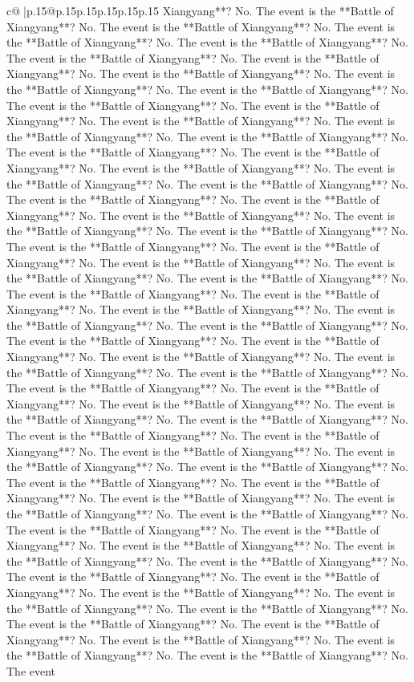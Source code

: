 \documentclass{article}
\begin{document}
{\begin{supertabular}{c@{$\;$}|p{.15\linewidth}@{}p{.15\linewidth}p{.15\linewidth}p{.15\linewidth}p{.15\linewidth}p{.15\linewidth}}
{{{Xiangyang**? No. The event is the **Battle of Xiangyang**? No. The event is the **Battle of Xiangyang**? No. The event is the **Battle of Xiangyang**? No. The event is the **Battle of Xiangyang**? No. The event is the **Battle of Xiangyang**? No. The event is the **Battle of Xiangyang**? No. The event is the **Battle of Xiangyang**? No. The event is the **Battle of Xiangyang**? No. The event is the **Battle of Xiangyang**? No. The event is the **Battle of Xiangyang**? No. The event is the **Battle of Xiangyang**? No. The event is the **Battle of Xiangyang**? No. The event is the **Battle of Xiangyang**? No. The event is the **Battle of Xiangyang**? No. The event is the **Battle of Xiangyang**? No. The event is the **Battle of Xiangyang**? No. The event is the **Battle of Xiangyang**? No. The event is the **Battle of Xiangyang**? No. The event is the **Battle of Xiangyang**? No. The event is the **Battle of Xiangyang**? No. The event is the **Battle of Xiangyang**? No. The event is the **Battle of Xiangyang**? No. The event is the **Battle of Xiangyang**? No. The event is the **Battle of Xiangyang**? No. The event is the **Battle of Xiangyang**? No. The event is the **Battle of Xiangyang**? No. The event is the **Battle of Xiangyang**? No. The event is the **Battle of Xiangyang**? No. The event is the **Battle of Xiangyang**? No. The event is the **Battle of Xiangyang**? No. The event is the **Battle of Xiangyang**? No. The event is the **Battle of Xiangyang**? No. The event is the **Battle of Xiangyang**? No. The event is the **Battle of Xiangyang**? No. The event is the **Battle of Xiangyang**? No. The event is the **Battle of Xiangyang**? No. The event is the **Battle of Xiangyang**? No. The event is the **Battle of Xiangyang**? No. The event is the **Battle of Xiangyang**? No. The event is the **Battle of Xiangyang**? No. The event is the **Battle of Xiangyang**? No. The event is the **Battle of Xiangyang**? No. The event is the **Battle of Xiangyang**? No. The event is the **Battle of Xiangyang**? No. The event is the **Battle of Xiangyang**? No. The event is the **Battle of Xiangyang**? No. The event is the **Battle of Xiangyang**? No. The event is the **Battle of Xiangyang**? No. The event is the **Battle of Xiangyang**? No. The event is the **Battle of Xiangyang**? No. The event is the **Battle of Xiangyang**? No. The event is the **Battle of Xiangyang**? No. The event is the **Battle of Xiangyang**? No. The event is the **Battle of Xiangyang**? No. The event is the **Battle of Xiangyang**? No. The event is the **Battle of Xiangyang**? No. The event is the **Battle of Xiangyang**? No. The event is the **Battle of Xiangyang**? No. The event is the **Battle of Xiangyang**? No. The event is the **Battle of Xiangyang**? No. The event is the **Battle of Xiangyang**? No. The event is the **Battle of Xiangyang**? No. The event is the **Battle of Xiangyang**? No. The event is the **Battle of Xiangyang**? No. The event is the **Battle of Xiangyang**? No. The event is the **Battle of Xiangyang**? No. The event is the **Battle of Xiangyang**? No. The event is the **Battle of Xiangyang**? No. The event is the **Battle of Xiangyang**? No. The event }}}
\end{supertabular}}
\end{document}
